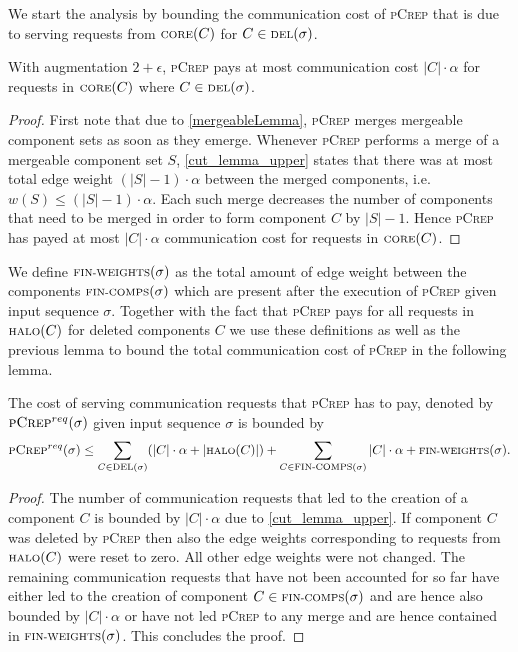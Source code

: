 \documentclass[a4paper,UKenglish,cleveref, autoref, thm-restate,authorcolumns]{lipics-v2019}
\newcommand{\adjDel}{\textsc{pCrep}}
\newcommand{\del}{\text{\scriptsize DEL}}
\newcommand{\core}{\text{\scriptsize CORE}}
\newcommand{\halo}{\text{\scriptsize HALO}}
\newcommand{\finalComps}{\text{\scriptsize FIN-COMPS}}
\newcommand{\finalWeights}{\text{\scriptsize FIN-WEIGHTS}}
\begin{document}
We start the analysis by bounding the communication cost of \adjDel{} that is due to serving requests from $\core(C)$ for $C\in\del{}(\sigma)$.

\begin{lemma}
	\label{core_comm_upper}
	With augmentation $2+\epsilon$, \adjDel{} pays at most communication cost $|C|\cdot\alpha$ for requests in $\core(C)$ where $C\in\del{}(\sigma)$.
\end{lemma}

\begin{proof}
	First note that due to \cref{mergeableLemma}, \adjDel{} merges mergeable component sets as soon as they emerge.
	Whenever \adjDel{} performs a merge of a mergeable component set $S$, \cref{cut_lemma_upper} states that there was at most total edge weight $(|S|-1)\cdot\alpha$ between the merged components, i.e. $w(S)\leq(|S|-1)\cdot\alpha$. Each such merge decreases the number of components that need to be merged in order to form component $C$ by $|S|-1$. Hence \adjDel{} has payed at most $|C|\cdot\alpha$ communication cost for requests in $\core(C)$.
\end{proof}

We define $\finalWeights{}(\sigma)$ as the total amount of edge weight between the components $\finalComps{}(\sigma)$ which are present after the execution of \adjDel{} given input sequence $\sigma$.
Together with the fact that \adjDel{} pays for all requests in $\halo(C)$ for deleted components $C$ we use these definitions as well as the previous lemma to bound the total communication cost of \adjDel{} in the following lemma.

\begin{lemma}
	\label{crep_req_bound}
	The cost of serving communication requests that \adjDel{} has to pay, denoted by $\adjDel{}^{req}(\sigma)$ given input sequence $\sigma$ is bounded by
	\begin{align*}
	\adjDel{}^{req}(\sigma)\leq\sum_{C\in\del{}(\sigma)}(|C|\cdot\alpha+|\halo(C)|)+\sum_{C\in \finalComps(\sigma)}|C|\cdot\alpha+\finalWeights(\sigma).
	\end{align*}
\end{lemma}

\begin{proof}
	The number of communication requests that led to the creation of a component $C$ is bounded by $|C|\cdot\alpha$ due to \cref{cut_lemma_upper}.
	If component $C$ was deleted by \adjDel{} then also the edge weights corresponding to requests from $\halo(C)$ were reset to zero. All other edge weights were not changed. The remaining communication requests that have not been accounted for so far have either led to the creation of component $C\in\finalComps(\sigma)$ and are hence also bounded by $|C|\cdot\alpha$ or have not led \adjDel{} to any merge and are hence contained in $\finalWeights(\sigma)$. This concludes the proof.
\end{proof}
\end{document}
